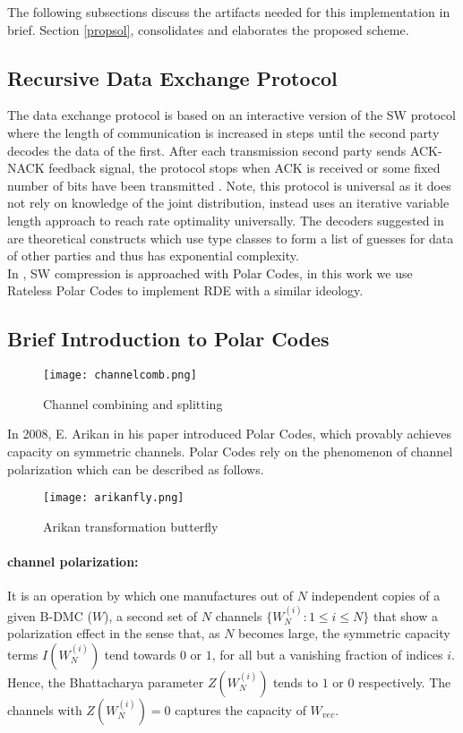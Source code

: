 \documentclass[
11pt, %
a4paper, %
oneside, %
headinclude,footinclude, %
BCOR5mm, %
]{scrartcl}
\begin{document}
The following subsections discuss the artifacts needed for this implementation in brief. Section \ref{propsol}, consolidates and elaborates the proposed scheme. 

\subsection{Recursive Data Exchange Protocol}
The data exchange protocol is based on an interactive version of the SW protocol where the length of communication is increased in steps until the second party decodes the data of the first. After each transmission second party sends ACK-NACK feedback signal, the protocol stops when ACK is received or some fixed number of bits have been transmitted \cite{htsw}. Note, this protocol is universal as it does not rely on knowledge of the joint distribution, instead uses an iterative variable length approach to reach rate optimality universally. The decoders suggested in \cite{htsw} are theoretical constructs which use type classes to form a list of guesses for data of other parties and thus has exponential complexity.\\ In \cite{pslep}, SW compression is approached with Polar Codes, in this work we use Rateless Polar Codes to implement RDE with a similar ideology.

\subsection{Brief Introduction to Polar Codes}
\begin{wrapfigure}{r}{0.5\textwidth}
  \begin{center}
    \texttt{[image: channelcomb.png]}
  \end{center}
  \caption{Channel combining and splitting}
  \label{fig:channelcomb}
\end{wrapfigure}
In 2008, E. Arikan in his paper \cite{arikan} introduced Polar Codes, which provably achieves capacity on symmetric channels. Polar Codes rely on the phenomenon of channel polarization which can be described as follows.
\begin{wrapfigure}{r}{0.5\textwidth}
  \begin{center}
    \texttt{[image: arikanfly.png]}
  \end{center}
  \caption{Arikan transformation butterfly}
  \label{fig:arikanfly}
\end{wrapfigure}
\paragraph{channel polarization:} It is an operation by which one manufactures out of $N$ independent copies of a given B-DMC ($W$), a second set of $N$ channels $\{W^{(i)}_N : 1 \leq i \leq N \}$ that show a polarization effect in the sense that, as $N$ becomes large, the symmetric capacity terms $I(W^{(i)}_N )$ tend towards $0$ or $1$, for all but a vanishing fraction of indices $i$. Hence, the Bhattacharya parameter $Z(W^{(i)}_N)$ tends to $1$ or $0$ respectively. The channels with $Z(W^{(i)}_N)=0$ captures the capacity of $W_{vec}$.
\end{document}
